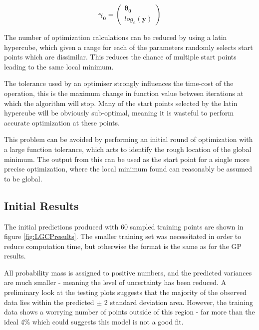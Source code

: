 \documentclass[a4paper,11pt]{report}
\begin{document}
\begin{equation} \label{eq:LGCPstartpoint}
\boldsymbol{\gamma_0} = \left( \begin{array}{cc}
\boldsymbol{\theta_0} \\
log_e(\mathbf{y}) \end{array} \right) 
\end{equation}

The number of optimization calculations can be reduced by using a latin hypercube, which given a range for each of the parameters randomly selects start points which are dissimilar. This reduces the chance of multiple start points leading to the same local minimum. \par

The tolerance used by an optimiser strongly influences the time-cost of the operation, this is the maximum change in function value between iterations at which the algorithm will stop. Many of the start points selected by the latin hypercube will be obviously sub-optimal, meaning it is wasteful to perform accurate optimization at these points. 

This problem can be avoided by performing an initial round of optimization with a large function tolerance, which acts to identify the rough location of the global minimum. The output from this can be used as the start point for a single more precise optimization, where the local minimum found can reasonably be assumed to be global.


\subsection{Initial Results}

The initial predictions produced with 60 sampled training points are shown in figure \ref{fig:LGCPresults}. The smaller training set was necessitated in order to reduce computation time, but otherwise the format is the same as for the GP results. \par

All probability mass is assigned to positive numbers, and the predicted variances are much smaller - meaning the level of uncertainty has been reduced. A preliminary look at the testing plots suggests that the majority of the observed  data lies within the predicted \(\pm\) 2 standard deviation area. However, the training data shows a worrying number of points outside of this region - far more than the ideal 4\% which could suggests this model is not a good fit. 
\end{document}
